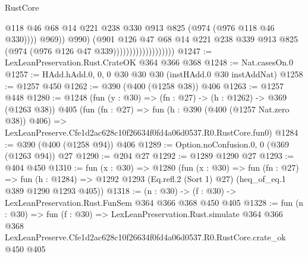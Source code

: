 \begin{lexlean}{RustCore}
\begin{coremodule}
                                              @118
                                              @46
                                              @68
                                              @14
                                              @221
                                              @238
                                              @330
                                              @913
                                              @825
                                              (@974 (@976 @118 @46 @330))))
                                          @969))
                                      @990)
                                    (@901
                                      @126
                                      @47
                                      @68
                                      @14
                                      @221
                                      @238
                                      @339
                                      @913
                                      @825
                                      (@974 (@976 @126 @47 @339)))))))))))))))))))
@1247 := LexLeanPreservation.Rust.CrateOK @364 @366 @368
@1248 := Nat.casesOn.{0}
@1257 := HAdd.hAdd.{0, 0, 0} @30 @30 @30 (instHAdd.{0} @30 instAddNat)
@1258 := @1257 @450
@1262 := @390 (@400 (@1258 @38)) @406
@1263 := @1257 @448
@1280 := @1248
    (fun (y : @30) => (fn : @27) -> (h : @1262) -> @369 (@1263 @38))
    @405
    (fun (fn : @27) =>
    fun (h : @390 (@400 (@1257 Nat.zero @38)) @406) =>
    LexLeanPreserve.Cfe1d2ac628c10f26634f0fd4a06d0537.R0.RustCore.fun0)
@1284 := @390 (@400 (@1258 @94)) @406
@1289 := Option.noConfusion.{0, 0} (@369 (@1263 @94)) @27
@1290 := @204 @27
@1292 := @1289 @1290 @27
@1293 := @404 @450
@1310 := fun (x : @30) =>
  @1280
    (fun (x : @30) =>
    fun (fn : @27) =>
    fun (h : @1284) => @1292 @1293 (Eq.refl.{2} (Sort 1) @27) (heq_of_eq.{1} @389 @1290 @1293 @405))
@1318 := (n : @30) -> (f : @30) -> LexLeanPreservation.Rust.FunSem @364 @366 @368 @450 @405
@1328 := fun (n : @30) =>
  fun (f : @30) =>
  LexLeanPreservation.Rust.simulate
    @364
    @366
    @368
    LexLeanPreserve.Cfe1d2ac628c10f26634f0fd4a06d0537.R0.RustCore.crate_ok
    @450
    @405
\end{coremodule}
\end{lexlean}
